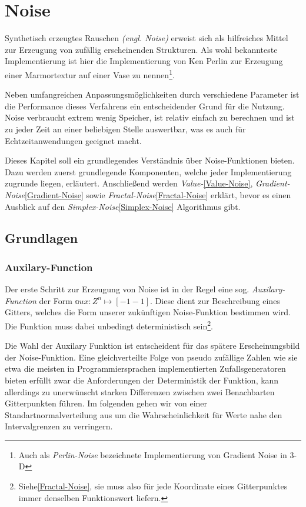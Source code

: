 \chapter{Noise}
Synthetisch erzeugtes Rauschen \emph{(engl. Noise)} erweist sich als hilfreiches Mittel zur Erzeugung von zufällig erscheinenden Strukturen.
Als wohl bekannteste Implementierung ist hier die Implementierung von Ken Perlin\cite{PERLIN1985} zur Erzeugung einer Marmortextur auf einer Vase zu nennen\footnote{Auch als \emph{Perlin-Noise} bezeichnete Implementierung von Gradient Noise in 3-D}.

Neben umfangreichen Anpassungsmöglichkeiten durch verschiedene Parameter ist die Performance dieses Verfahrens ein entscheidender Grund für die Nutzung. Noise verbraucht extrem wenig Speicher, ist relativ einfach zu berechnen und ist zu jeder Zeit an einer beliebigen Stelle auswertbar, was es auch für Echtzeitanwendungen geeignet macht.\cite{H.Hauser2010}

Dieses Kapitel soll ein grundlegendes Verständnis über Noise-Funktionen bieten. Dazu werden zuerst grundlegende Komponenten, welche jeder Implementierung zugrunde liegen, erläutert. Anschließend werden \emph{Value-}\ref{Value-Noise}, \emph{Gradient-Noise}\ref{Gradient-Noise} sowie \emph{Fractal-Noise}\ref{Fractal-Noise} erklärt, bevor es einen Ausblick auf den \emph{Simplex-Noise}\ref{Simplex-Noise} Algorithmus gibt. 

\section{Grundlagen}
\subsection{Auxilary-Function}\label{auxFunc}
Der erste Schritt zur Erzeugung von Noise ist in der Regel eine sog. \emph{Auxilary-Function}\cite{fractalsAndChaos} der Form \begin{math}\mathbb aux: {Z}^n \mapsto [-1 - 1]\end{math}\label{auxFunc}.
Diese dient zur Beschreibung eines Gitters, welches die Form unserer zukünftigen Noise-Funktion bestimmen wird. Die Funktion muss dabei unbedingt deterministisch sein\footnote{Siehe\ref{Fractal-Noise}, sie muss also für jede Koordinate eines Gitterpunktes immer denselben Funktionswert liefern.}.

Die Wahl der Auxilary Funktion ist entscheident für das spätere Erscheinungsbild der Noise-Funktion.
Eine gleichverteilte Folge von pseudo zufällige Zahlen wie sie etwa die meisten in Programmiersprachen implementierten Zufallsgeneratoren bieten erfüllt zwar die Anforderungen der Deterministik der Funktion, kann allerdings zu unerwünscht starken Differenzen zwischen zwei Benachbarten Gitterpunkten führen. Im folgenden gehen wir von einer Standartnormalverteilung aus um die Wahrscheinlichkeit für Werte nahe den Intervalgrenzen zu verringern. 

